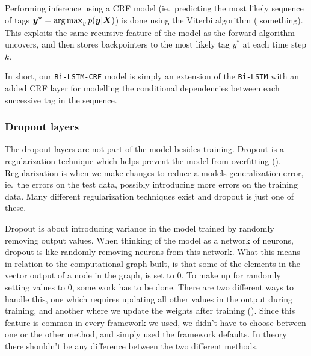 Performing inference using a CRF model (ie.\ predicting the most likely sequence
of tags $\bm{y^{*}} = \operatorname*{arg\,max}_{y}p(\bm{y}|\bm{X})$) is done using the Viterbi
algorithm (\cite{sutton2012introduction} something). This exploits the same
recursive feature of the model as the forward algorithm uncovers, and then
stores backpointers to the most likely tag $y^{*}$ at each time step $k$.

In short, our \texttt{Bi-LSTM-CRF} model is simply an extension of the
\texttt{Bi-LSTM} with an added CRF layer for modelling the conditional
dependencies between each successive tag in the sequence.

\subsubsection{Dropout layers}

The dropout layers are not part of the model besides training. Dropout is a
regularization technique which helps prevent the model from
overfitting (\cite{goodfellow2016deep}). Regularization is when we make changes to
reduce a models generalization error, ie.\ the errors on the test data, possibly
introducing more errors on the training data. Many different regularization
techniques exist and dropout is just one of these.

Dropout is about introducing variance in the model trained by randomly removing
output values. When thinking of the model as a network of neurons, dropout is
like randomly removing neurons from this network. What this means in relation to
the computational graph built, is that some of the elements in the vector output
of a node in the graph, is set to 0. To make up for randomly setting values to
0, some work has to be done. There are two different ways to handle this, one
which requires updating all other values in the output during training, and
another where we update the weights after training (\cite{goodfellow2016deep}).
Since this feature is common in every framework we used, we didn't have to
choose between one or the other method, and simply used the framework defaults.
In theory there shouldn't be any difference between the two different methods.

